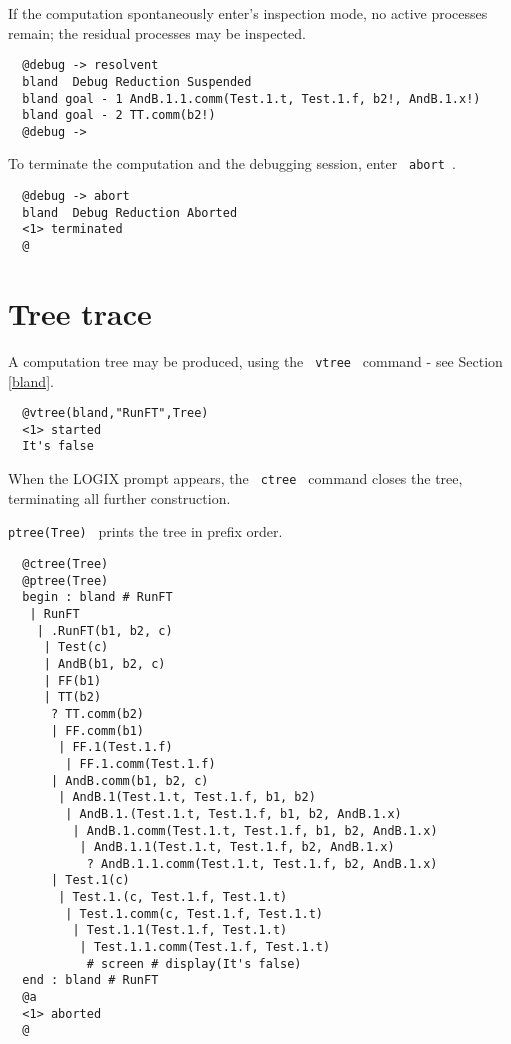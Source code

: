 \noindent
If the computation spontaneously enter's inspection mode,
no active processes remain; the residual processes may
be inspected.

\begin{verbatim}
  @debug -> resolvent
  bland  Debug Reduction Suspended
  bland goal - 1 AndB.1.1.comm(Test.1.t, Test.1.f, b2!, AndB.1.x!)
  bland goal - 2 TT.comm(b2!)
  @debug ->
\end{verbatim}

\noindent
To terminate the computation and the debugging session,
enter \verb+ abort +.

\begin{verbatim}
  @debug -> abort
  bland  Debug Reduction Aborted
  <1> terminated
  @
\end{verbatim}

\section{Tree trace}
\label{vtree traces}

A computation tree may be produced, using the \verb+ vtree +
command - see Section \ref{bland}.

\begin{verbatim}
  @vtree(bland,"RunFT",Tree)
  <1> started
  It's false
\end{verbatim}

\noindent
When the LOGIX prompt appears,
the \verb+ ctree + command closes the tree, terminating
all further construction.

\noindent
\verb+ptree(Tree) + prints the tree in prefix order.

\begin{verbatim}
  @ctree(Tree)
  @ptree(Tree)
  begin : bland # RunFT
   | RunFT
    | .RunFT(b1, b2, c)
     | Test(c)
     | AndB(b1, b2, c)
     | FF(b1)
     | TT(b2)
      ? TT.comm(b2)
      | FF.comm(b1)
       | FF.1(Test.1.f)
        | FF.1.comm(Test.1.f)
      | AndB.comm(b1, b2, c)
       | AndB.1(Test.1.t, Test.1.f, b1, b2)
        | AndB.1.(Test.1.t, Test.1.f, b1, b2, AndB.1.x)
         | AndB.1.comm(Test.1.t, Test.1.f, b1, b2, AndB.1.x)
          | AndB.1.1(Test.1.t, Test.1.f, b2, AndB.1.x)
           ? AndB.1.1.comm(Test.1.t, Test.1.f, b2, AndB.1.x)
      | Test.1(c)
       | Test.1.(c, Test.1.f, Test.1.t)
        | Test.1.comm(c, Test.1.f, Test.1.t)
         | Test.1.1(Test.1.f, Test.1.t)
          | Test.1.1.comm(Test.1.f, Test.1.t)
           # screen # display(It's false)
  end : bland # RunFT
  @a
  <1> aborted
  @
\end{verbatim}

